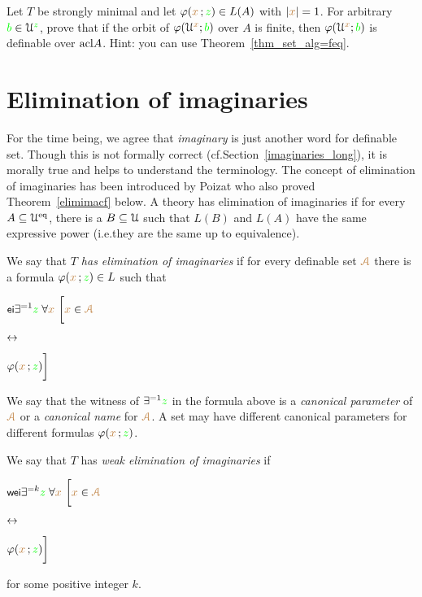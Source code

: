 \begin{exercise}
Let $T$ be strongly minimal and let $\varphi({\color{brown} x}\,;{\color{green} z})\in L(A)$ with $|{\color{brown} x}|=1$.
For arbitrary ${\color{green} b}\in\EuScript U^{\color{green} z}$, prove that if the orbit of $\varphi(\EuScript U^{\color{brown} x}; {\color{green} b})$ over $A$ is finite, then $\varphi(\EuScript U^{\color{brown} x}; {\color{green} b})$ is definable over ${\rm acl} A$.
Hint: you can use Theorem~\ref{thm_set_alg=feq}.
\end{exercise}


\section{Elimination of imaginaries}\label{elimination_imaginaries}

\def\medrel#1{\parbox[t]{5ex}{$\displaystyle\hfil #1$}}
\def\ceq#1#2#3{\parbox[t]{20ex}{$\displaystyle #1$}\medrel{#2}{$\displaystyle #3$}}

For the time being, we agree that \textit{imaginary\/} is just another word for definable set.
Though this is not formally correct (cf.\@ Section~\ref{imaginaries_long}), it is morally true and helps to understand the terminology.
The concept of elimination of imaginaries has been introduced by Poizat who also proved Theorem~\ref{elimimacf} below.
A theory has elimination of imaginaries if for every $A\subseteq\EuScript U^{{\rm eq}}$, there is a $B\subseteq\EuScript U$ such that $L(B)$ and $L(A)$ have the same expressive power (i.e.\@ they are the same up to equivalence).


\begin{definition}\label{defelimanazioneimmaginari}
We say that \emph{$T$ has elimination of imaginaries\/} if for every definable set ${\color{brown}\EuScript A}$ there is a formula $\varphi({\color{brown} x}\,;{\color{green} z})\in L$ such that\smallskip

\ceq{\ssf{ei}\hfill\E^{=1} {\gr z}\;\A {\mr x}\ \bigg[{\mr x}\in{\vl\Aa}}{\iff}{\phi({\mr x}\,;{\gr z})\bigg]}

We say that the witness of $\exists^{=1}{\color{green} z}$ in the formula above is a \emph{canonical parameter\/} of ${\color{brown}\EuScript A}$ or a \emph{canonical name\/} for ${\color{brown}\EuScript A}$.
A set may have different canonical parameters for different formulas $\varphi({\color{brown} x}\,;{\color{green} z})$.

We say that $T$ has \emph{weak elimination of imaginaries\/} if\smallskip

\ceq{\ssf{wei}\hfill\E^{=k} {\gr z}\;\A {\mr x}\ \bigg[{\mr x}\in{\vl\Aa}}{\iff}{\phi({\mr x}\,;{\gr z})\bigg]}

for some positive integer $k$.
\end{definition}


